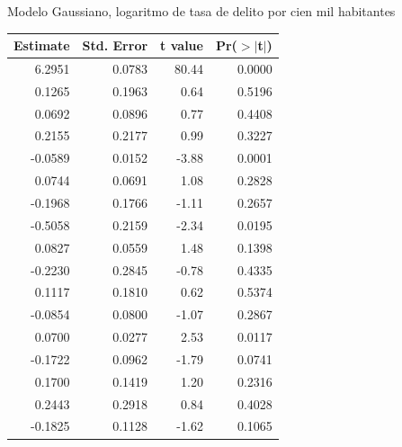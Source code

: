 \documentclass[ignorenonframetext,]{beamer}
\begin{document}
\begin{frame}{Modelo Gaussiano, logaritmo de tasa de delito por cien mil
habitantes}

\begin{table}[ht]
\centering
{\small
\begin{tabular}{rrrr}
  \hline
Estimate & Std. Error & t value & Pr($>$$|$t$|$) \\ 
  \hline
6.2951 & 0.0783 & 80.44 & 0.0000 \\ 
  0.1265 & 0.1963 & 0.64 & 0.5196 \\ 
  0.0692 & 0.0896 & 0.77 & 0.4408 \\ 
  0.2155 & 0.2177 & 0.99 & 0.3227 \\ 
  -0.0589 & 0.0152 & -3.88 & 0.0001 \\ 
  0.0744 & 0.0691 & 1.08 & 0.2828 \\ 
  -0.1968 & 0.1766 & -1.11 & 0.2657 \\ 
  -0.5058 & 0.2159 & -2.34 & 0.0195 \\ 
  0.0827 & 0.0559 & 1.48 & 0.1398 \\ 
  -0.2230 & 0.2845 & -0.78 & 0.4335 \\ 
  0.1117 & 0.1810 & 0.62 & 0.5374 \\ 
  -0.0854 & 0.0800 & -1.07 & 0.2867 \\ 
  0.0700 & 0.0277 & 2.53 & 0.0117 \\ 
  -0.1722 & 0.0962 & -1.79 & 0.0741 \\ 
  0.1700 & 0.1419 & 1.20 & 0.2316 \\ 
  0.2443 & 0.2918 & 0.84 & 0.4028 \\ 
  -0.1825 & 0.1128 & -1.62 & 0.1065 \\ 
   \hline
\end{tabular}
}
\end{table}

\end{frame}
\end{document}

